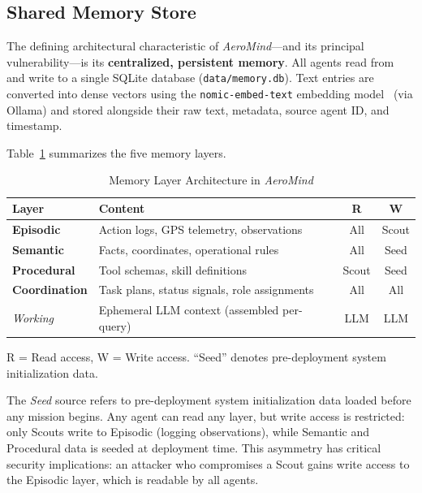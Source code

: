 \documentclass[conference]{IEEEtran}
\begin{document}
\subsection{Shared Memory Store}
The defining architectural characteristic of \textit{AeroMind}---and its principal vulnerability---is its \textbf{centralized, persistent memory}. All agents read from and write to a single SQLite database (\texttt{data/memory.db}). Text entries are converted into dense vectors using the \texttt{nomic-embed-text} embedding model~\cite{nussbaum2024nomic} (via Ollama) and stored alongside their raw text, metadata, source agent ID, and timestamp.

Table~\ref{tab:memory_layers} summarizes the five memory layers.

\begin{table}[t]
\caption{Memory Layer Architecture in \textit{AeroMind}}
\label{tab:memory_layers}
\centering
\begin{tabularx}{\columnwidth}{l X c c}
\toprule
\textbf{Layer} & \textbf{Content} & \textbf{R} & \textbf{W} \\
\midrule
\textbf{Episodic} & Action logs, GPS telemetry, observations & All & Scout \\
\textbf{Semantic} & Facts, coordinates, operational rules & All & Seed \\
\textbf{Procedural} & Tool schemas, skill definitions & Scout & Seed \\
\textbf{Coordination} & Task plans, status signals, role assignments & All & All \\
\midrule
\textit{Working} & Ephemeral LLM context (assembled per-query) & LLM & LLM \\
\bottomrule
\end{tabularx}
\vspace{1pt}
{\footnotesize R = Read access, W = Write access. ``Seed'' denotes pre-deployment system initialization data.}
\end{table}

The \textit{Seed} source refers to pre-deployment system initialization data loaded before any mission begins. Any agent can read any layer, but write access is restricted: only Scouts write to Episodic (logging observations), while Semantic and Procedural data is seeded at deployment time. This asymmetry has critical security implications: an attacker who compromises a Scout gains write access to the Episodic layer, which is readable by all agents.
\end{document}

